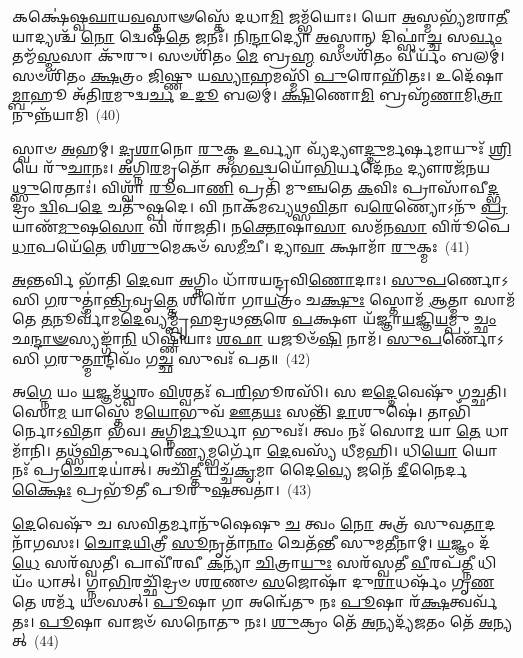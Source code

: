 𑌕𑌕𑍍𑌷𑍇॑𑌷𑍍𑌵\-\ul{𑌘𑌾}\-𑌯\-\ul{𑌵}\-𑌸𑍍𑌤𑌾𑍟𑌸𑍍𑌤𑍇᳴ 𑌦𑌧𑌾\-\ul{𑌮𑌿} 𑌜𑌮𑍍𑌭᳴𑌯𑍋𑌃। 𑌯𑍋 \ul{𑌅}\-𑌸𑍍𑌮𑌭𑍍𑌯᳴𑌮𑌰𑌾\-\ul{𑌤𑍀}\-𑌯𑌾𑌦𑍍𑌯𑌶𑍍𑌚᳴ \ul{𑌨𑍋} 𑌦𑍍𑌵𑍇𑌷᳴\-\ul{𑌤𑍇} 𑌜𑌨𑌃᳴। 𑌨𑌿\-\ul{𑌨𑍍𑌦𑌾}\-𑌦𑍍𑌯𑍋 \ul{𑌅}\-𑌸𑍍𑌮𑌾𑌨𑍍 𑌦𑌿𑌫𑍍𑌸𑌾॑\-\ul{𑌚𑍍𑌚} 𑌸\-\ul{𑌰𑍍𑌵𑌂} 𑌤𑌮𑍍𑌮᳴\-\ul{𑌸𑍍𑌮}\-𑌸𑌾 𑌕𑍁᳴𑌰𑍁। 𑌸𑍞𑌶𑌿᳴𑌤𑌂 \ul{𑌮𑍇} 𑌬𑍍𑌰\-\ul{𑌹𑍍𑌮} 𑌸𑍞𑌶𑌿᳴𑌤𑌂 𑌵𑍀𑌰𑍍𑌯𑌂᳴ 𑌬𑌲𑌮𑍍॑। 𑌸𑍞𑌶𑌿᳴𑌤𑌂 \ul{𑌕𑍍𑌷}\-𑌤𑍍𑌰𑌂 \ul{𑌜𑌿}\-𑌷𑍍𑌣𑍁 𑌯\-\ul{𑌸𑍍𑌯𑌾}\-𑌹𑌮𑌸𑍍𑌮𑌿᳴ \ul{𑌪𑍁}\-𑌰𑍋𑌹𑌿᳴𑌤𑌃। 𑌉𑌦𑍇᳴𑌷𑌾\-\ul{𑌮𑍍𑌬𑌾}\-𑌹𑍂 𑌅᳴𑌤𑌿\-\ul{𑌰}\-𑌮𑍁𑌦𑍍𑌵\-\ul{𑌰𑍍𑌚} 𑌉\-\ul{𑌦𑍂} 𑌬𑌲𑌮𑍍॑। \ul{𑌕𑍍𑌷𑌿}\-𑌣𑍋\-\ul{𑌮𑌿} 𑌬𑍍𑌰𑌹𑍍𑌮᳴\-\ul{𑌣𑌾}\-𑌮𑌿\-\ul{𑌤𑍍𑌰𑌾}\-𑌨𑍁𑌨𑍍𑌨᳴𑌯𑌾𑌮𑌿~(40)

𑌸𑍍𑌵𑌾𑍞 \ul{𑌅}\-𑌹𑌮𑍍। \ul{𑌦𑍃}\-\-\ul{𑌶𑌾}\-𑌨𑍋 \ul{𑌰𑍁}\-𑌕𑍍𑌮 \ul{𑌉}\-𑌰𑍍𑌵𑍍𑌯𑌾 𑌵𑍍𑌯᳴𑌦𑍍𑌯𑍗\-\ul{𑌦𑍍𑌦𑍁}\-𑌰𑍍𑌮𑌰𑍍\mbox{}\-\ul{𑌷}\-𑌮𑌾𑌯𑍁𑌃᳴ \ul{𑌶𑍍𑌰𑌿}\-𑌯𑍇 𑌰𑍁᳴\-\ul{𑌚𑌾}\-𑌨𑌃। \ul{𑌅}\-𑌗𑍍𑌨𑌿\-\ul{𑌰}\-𑌮𑍃𑌤𑍋᳴ 𑌅𑌭\-\ul{𑌵}\-𑌦𑍍𑌵𑌯𑍋᳴\-\ul{𑌭𑌿}\-𑌰𑍍𑌯𑌦𑍇᳴\-\ul{𑌨𑌂} 𑌦𑍍𑌯𑍗𑌰𑌜᳴𑌨𑌯\-\ul{𑌥𑍍𑌸𑍁}\-𑌰𑍇𑌤𑌾𑌃॑। 𑌵𑌿𑌶𑍍𑌵𑌾᳴ \ul{𑌰𑍂}\-𑌪𑌾\-\ul{𑌣𑌿} 𑌪𑍍𑌰𑌤𑌿᳴ 𑌮𑍁𑌞𑍍𑌚𑌤𑍇 \ul{𑌕}\-𑌵𑌿𑌃 𑌪𑍍𑌰𑌾𑌸𑌾᳴𑌵𑍀\-\ul{𑌦𑍍𑌭}\-𑌦𑍍𑌰𑌂 \ul{𑌦𑍍𑌵𑌿}\-𑌪\-\ul{𑌦𑍇} 𑌚𑌤𑍁᳴𑌷𑍍𑌪𑌦𑍇। 𑌵𑌿 𑌨𑌾𑌕᳴𑌮𑌖𑍍𑌯𑌥𑍍𑌸\-\ul{𑌵𑌿}\-𑌤𑌾 𑌵\-\ul{𑌰𑍇}\-𑌣𑍍𑌯𑍋\-𑌽𑌨𑍁᳴ \ul{𑌪𑍍𑌰}\-𑌯𑌾𑌣᳴\-\ul{𑌮𑍁}\-𑌷\-\ul{𑌸𑍋} 𑌵𑌿 𑌰𑌾᳴𑌜𑌤𑌿। 𑌨\-\ul{𑌕𑍍𑌤𑍋}\-𑌷𑌾\-\ul{𑌸𑌾} 𑌸𑌮᳴𑌨\-\ul{𑌸𑌾} 𑌵𑌿𑌰𑍂᳴𑌪𑍇 \ul{𑌧𑌾}\-𑌪𑌯𑍇᳴\-\ul{𑌤𑍇} 𑌶𑌿\-\ul{𑌶𑍁}\-𑌮𑍇𑌕𑍞᳴ 𑌸\-\ul{𑌮𑍀}\-𑌚𑍀। 𑌦𑍍𑌯𑌾\-\ul{𑌵𑌾} 𑌕𑍍𑌷𑌾𑌮𑌾᳴ \ul{𑌰𑍁}\-𑌕𑍍𑌮𑌃~(41)

\-\ul{𑌅}\-𑌨𑍍𑌤𑌰𑍍𑌵𑌿 𑌭𑌾᳴𑌤𑌿 \ul{𑌦𑍇}\-𑌵𑌾 \ul{𑌅}\-𑌗𑍍𑌨𑌿𑌂 𑌧𑌾᳴𑌰𑌯𑌨𑍍𑌦𑍍𑌰𑌵𑌿\-\ul{𑌣𑍋}\-𑌦𑌾𑌃। \ul{𑌸𑍁}\-\-\ul{𑌪}\-𑌰𑍍𑌣𑍋\-𑌽𑌸𑌿 \ul{𑌗}\-𑌰𑍁𑌤𑍍𑌮𑌾॑\-\ul{𑌨𑍍𑌤𑍍𑌰𑌿}\-𑌵𑍃\-\ul{𑌤𑍍𑌤𑍇} 𑌶𑌿𑌰𑍋᳴ 𑌗𑌾\-\ul{𑌯}\-𑌤𑍍𑌰𑌂 𑌚\-\ul{𑌕𑍍𑌷𑍁𑌃} 𑌸𑍍𑌤𑍋𑌮᳴ \ul{𑌆}\-𑌤𑍍𑌮𑌾 𑌸𑌾𑌮᳴ 𑌤𑍇 \ul{𑌤}\-𑌨𑍂𑌰𑍍𑌵𑌾᳴𑌮\-\ul{𑌦𑍇}\-𑌵𑍍𑌯𑌮𑍍𑌬𑍃᳴𑌹𑌦𑍍𑌰𑌥\-\ul{𑌨𑍍𑌤}\-𑌰𑍇 \ul{𑌪}\-𑌕𑍍𑌷𑍗 𑌯᳴𑌜𑍍𑌞𑌾\-\ul{𑌯}\-𑌜𑍍𑌞𑌿\-\ul{𑌯}\-𑌮𑍍𑌪𑍁\-\ul{𑌚𑍍𑌛𑌂} 𑌛\-\ul{𑌨𑍍𑌦𑌾}\-\-\ul{𑍟}\-𑌸𑍍𑌯𑌙𑍍𑌗𑌾᳴\-\ul{𑌨𑌿} 𑌧𑌿𑌷𑍍𑌣𑌿᳴𑌯𑌾𑌃 \ul{𑌶}\-\-\ul{𑌫𑌾} 𑌯𑌜𑍂𑍞᳴\-\ul{𑌷𑌿} 𑌨𑌾𑌮᳴। \ul{𑌸𑍁}\-\-\ul{𑌪}\-𑌰𑍍𑌣𑍋᳴\-𑌽𑌸𑌿 \ul{𑌗}\-𑌰𑍁\-\ul{𑌤𑍍𑌮𑌾}\-𑌨𑍍𑌦𑌿𑌵𑌂᳴ 𑌗\-\ul{𑌚𑍍𑌛} 𑌸𑍁𑌵𑌃᳴ 𑌪𑌤॥~(42)

{\anuvakamend[{𑌨𑌾\-\ul{𑌭𑌾} 𑌵\-\ul{𑌨𑍇} 𑌯𑍇𑌨᳴ 𑌯𑌾\-\ul{𑌮𑌿} 𑌕𑍍𑌷𑌾𑌮𑌾᳴ \ul{𑌰𑍁}\-𑌕𑍍𑌮𑍋॑\-𑌽𑌷𑍍𑌟𑌾𑌤𑍍𑌰𑌿𑍞᳴𑌶𑌚𑍍𑌚}]}%

𑌅\-\ul{𑌗𑍍𑌨𑍇} 𑌯𑌂 \ul{𑌯}\-𑌜𑍍𑌞𑌮᳴\-\ul{𑌧𑍍𑌵}\-𑌰𑌂 \ul{𑌵𑌿}\-𑌶𑍍𑌵𑌤𑌃᳴ 𑌪\-\ul{𑌰𑌿}\-𑌭𑍂𑌰𑌸𑌿᳴। 𑌸 𑌇\-\ul{𑌦𑍍𑌦𑍇}\-𑌵𑍇𑌷𑍁᳴ 𑌗𑌚𑍍𑌛𑌤𑌿। 𑌸𑍋\-\ul{𑌮} 𑌯𑌾𑌸𑍍𑌤𑍇᳴ 𑌮\-\ul{𑌯𑍋}\-𑌭𑍁𑌵᳴ \ul{𑌊}\-𑌤\-\ul{𑌯𑌃} 𑌸𑌨𑍍𑌤𑌿᳴ \ul{𑌦𑌾}\-𑌶𑍁𑌷𑍇॑। 𑌤𑌾𑌭𑌿᳴𑌰𑍍𑌨𑍋\-𑌽\-\ul{𑌵𑌿}\-𑌤𑌾 𑌭᳴𑌵। \ul{𑌅}\-𑌗𑍍𑌨𑌿\-\ul{𑌰𑍍𑌮𑍂}\-𑌰𑍍𑌧𑌾 𑌭𑍁𑌵𑌃᳴। 𑌤𑍍𑌵𑌂 𑌨𑌃᳴ 𑌸𑍋\-\ul{𑌮} 𑌯𑌾 \ul{𑌤𑍇} 𑌧𑌾𑌮𑌾᳴𑌨𑌿। 𑌤𑌥𑍍𑌸᳴\-\ul{𑌵𑌿}\-𑌤𑍁𑌰𑍍𑌵𑌰𑍇॑\-\ul{𑌣𑍍𑌯}\-𑌮𑍍𑌭𑌰𑍍𑌗𑍋᳴ \ul{𑌦𑍇}\-𑌵𑌸𑍍𑌯᳴ 𑌧𑍀𑌮𑌹𑌿। 𑌧𑌿\-\ul{𑌯𑍋} 𑌯𑍋 𑌨𑌃᳴ 𑌪𑍍𑌰\-\ul{𑌚𑍋}\-𑌦𑌯𑌾॑𑌤𑍍। 𑌅𑌚𑌿᳴\-\ul{𑌤𑍍𑌤𑍀} 𑌯𑌚𑍍𑌚᳴\-\ul{𑌕𑍃}\-𑌮𑌾 𑌦𑍈\-\ul{𑌵𑍍𑌯𑍇} 𑌜𑌨𑍇᳴ \ul{𑌦𑍀}\-𑌨𑍈𑌰𑍍𑌦\-\ul{𑌕𑍍𑌷𑍈𑌃} 𑌪𑍍𑌰𑌭𑍂᳴𑌤𑍀 𑌪𑍂𑌰𑍁\-\ul{𑌷}\-𑌤𑍍𑌵𑌤𑌾॑।~(43)

\-\ul{𑌦𑍇}\-𑌵𑍇𑌷𑍁᳴ 𑌚 𑌸𑌵𑌿\-\ul{𑌤}\-𑌰𑍍𑌮𑌾𑌨𑍁᳴𑌷𑍇𑌷𑍁 \ul{𑌚} 𑌤𑍍𑌵𑌂 \ul{𑌨𑍋} 𑌅𑌤𑍍𑌰᳴ 𑌸𑍁𑌵\-\ul{𑌤𑌾}\-𑌦𑌨𑌾᳴𑌗𑌸𑌃। \ul{𑌚𑍋}\-\-\ul{𑌦}\-\-\ul{𑌯𑌿}\-𑌤𑍍𑌰𑍀 \ul{𑌸𑍂}\-𑌨𑍃𑌤𑌾᳴\-\ul{𑌨𑌾𑌂} 𑌚𑍇𑌤᳴𑌨𑍍𑌤𑍀 𑌸𑍁𑌮\-\ul{𑌤𑍀}\-𑌨𑌾𑌮𑍍। \ul{𑌯}\-𑌜𑍍𑌞𑌂 𑌦᳴\-\ul{𑌧𑍇} 𑌸𑌰᳴𑌸𑍍𑌵𑌤𑍀। 𑌪𑌾𑌵𑍀᳴𑌰𑌵𑍀 \ul{𑌕}\-𑌨𑍍𑌯𑌾᳴ \ul{𑌚𑌿}\-𑌤𑍍𑌰𑌾\-\ul{𑌯𑍁𑌃} 𑌸𑌰᳴𑌸𑍍𑌵𑌤𑍀 \ul{𑌵𑍀}\-𑌰𑌪᳴\-\ul{𑌤𑍍𑌨𑍀} 𑌧𑌿𑌯𑌂᳴ 𑌧𑌾𑌤𑍍। 𑌗𑍍𑌨𑌾\-\ul{𑌭𑌿}\-𑌰𑌚𑍍𑌛𑌿᳴𑌦𑍍𑌰𑍞 𑌶\-\ul{𑌰}\-𑌣𑍞 \ul{𑌸}\-𑌜𑍋𑌷𑌾᳴ 𑌦𑍁\-\ul{𑌰𑌾}\-𑌧𑌰𑍍\mbox{}𑌷𑌂᳴ 𑌗𑍃\-\ul{𑌣}\-𑌤𑍇 𑌶𑌰𑍍𑌮᳴ 𑌯𑍞𑌸𑌤𑍍। \ul{𑌪𑍂}\-𑌷𑌾 𑌗𑌾 𑌅𑌨𑍍𑌵𑍇᳴𑌤𑍁 𑌨𑌃 \ul{𑌪𑍂}\-𑌷𑌾 𑌰᳴\-\ul{𑌕𑍍𑌷}\-𑌤𑍍𑌵𑌰𑍍𑌵᳴𑌤𑌃। \ul{𑌪𑍂}\-𑌷𑌾 𑌵𑌾𑌜𑍞᳴ 𑌸𑌨𑍋𑌤𑍁 𑌨𑌃। \ul{𑌶𑍁}\-𑌕𑍍𑌰𑌂 𑌤𑍇᳴ \ul{𑌅}\-𑌨𑍍𑌯𑌦𑍍𑌯᳴\-\ul{𑌜}\-𑌤𑌂 𑌤𑍇᳴ \ul{𑌅}\-𑌨𑍍𑌯𑌤𑍍~(44)

